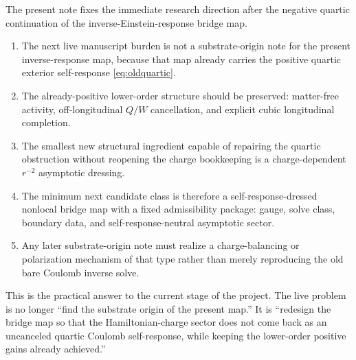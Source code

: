 \documentclass[11pt]{article}
\begin{document}
The present note fixes the immediate research direction after the negative quartic continuation of the inverse-Einstein-response bridge map.

\begin{enumerate}
    \item The next live manuscript burden is not a substrate-origin note for the present inverse-response map, because that map already carries the positive quartic exterior self-response \eqref{eq:oldquartic}.
    \item The already-positive lower-order structure should be preserved: matter-free activity, off-longitudinal \(Q/W\) cancellation, and explicit cubic longitudinal completion.
    \item The smallest new structural ingredient capable of repairing the quartic obstruction without reopening the charge bookkeeping is a charge-dependent \(r^{-2}\) asymptotic dressing.
    \item The minimum next candidate class is therefore a self-response-dressed nonlocal bridge map with a fixed admissibility package: gauge, solve class, boundary data, and self-response-neutral asymptotic sector.
    \item Any later substrate-origin note must realize a charge-balancing or polarization mechanism of that type rather than merely reproducing the old bare Coulomb inverse solve.
\end{enumerate}

This is the practical answer to the current stage of the project. The live problem is no longer ``find the substrate origin of the present map.'' It is ``redesign the bridge map so that the Hamiltonian-charge sector does not come back as an uncanceled quartic Coulomb self-response, while keeping the lower-order positive gains already achieved.''
\end{document}
